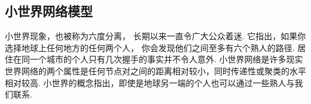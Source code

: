 \documentclass[bachelor,adobefonts]{jnuthesis}
\begin{document}










\subsection{小世界网络模型}

小世界现象，也被称为六度分离，
长期以来一直令广大公众着迷.
它指出，如果你选择地球上任何地方的任何两个人，
你会发现他们之间至多有六个熟人的路径.
居住在同一个城市的个人只有几次握手的事实并不令人意外.
小世界网络是许多现实世界网络的两个属性是任何节点对之间的距离相对较小，同时传递性或聚类的水平相对较高.
小世界的概念指出，即使是地球另一端的个人也可以通过一些熟人与我们联系.
\end{document}
